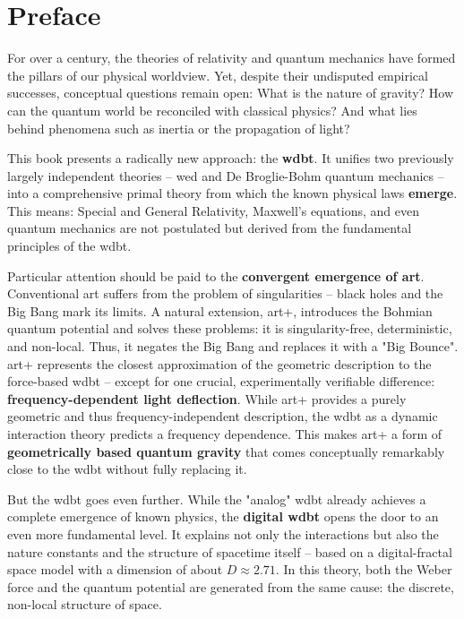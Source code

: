 \documentclass[11pt, a5paper, twoside, openright]{book}
\begin{document}
\chapter*{Preface}
For over a century, the theories of relativity and quantum mechanics have formed the pillars of our physical worldview. Yet, despite their undisputed empirical successes, conceptual questions remain open: What is the nature of gravity? How can the quantum world be reconciled with classical physics? And what lies behind phenomena such as inertia or the propagation of light?

This book presents a radically new approach: the \textbf{\gls{wdbt}}. It unifies two previously largely independent theories – \gls{wed} and De Broglie-Bohm quantum mechanics – into a comprehensive primal theory from which the known physical laws \textbf{emerge}. This means: Special and General Relativity, Maxwell's equations, and even quantum mechanics are not postulated but derived from the fundamental principles of the \gls{wdbt}.

Particular attention should be paid to the \textbf{convergent emergence of \gls{art}}. Conventional \gls{art} suffers from the problem of singularities – black holes and the Big Bang mark its limits. A natural extension, \gls{art}+, introduces the Bohmian quantum potential and solves these problems: it is singularity-free, deterministic, and non-local. Thus, it negates the Big Bang and replaces it with a "Big Bounce". \gls{art}+ represents the closest approximation of the geometric description to the force-based \gls{wdbt} – except for one crucial, experimentally verifiable difference: \textbf{frequency-dependent light deflection}. While \gls{art}+ provides a purely geometric and thus frequency-independent description, the \gls{wdbt} as a dynamic interaction theory predicts a frequency dependence. This makes \gls{art}+ a form of \textbf{geometrically based quantum gravity} that comes conceptually remarkably close to the \gls{wdbt} without fully replacing it.

But the \gls{wdbt} goes even further. While the "analog" \gls{wdbt} already achieves a complete emergence of known physics, the \textbf{digital \gls{wdbt}} opens the door to an even more fundamental level. It explains not only the interactions but also the nature constants and the structure of spacetime itself – based on a digital-fractal space model with a dimension of about $D \approx 2.71$. In this theory, both the Weber force and the quantum potential are generated from the same cause: the discrete, non-local structure of space.
\end{document}
